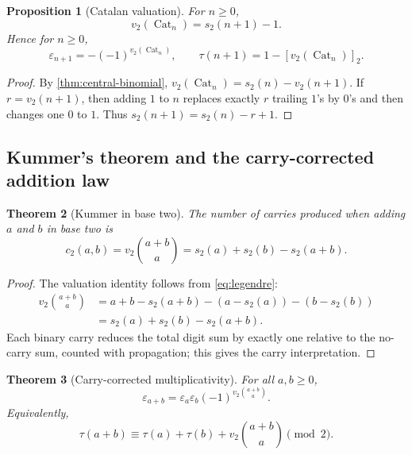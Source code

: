 \documentclass[11pt,oneside]{article}
\newtheorem{theorem}{Theorem}[section]
\newtheorem{proposition}[theorem]{Proposition}
\theoremstyle{definition}
\theoremstyle{remark}
\newcommand{\vtwo}{v_2}
\newcommand{\bitsum}{s_2}
\newcommand{\eps}{\varepsilon}
\newcommand{\res}[2]{\left[#1\right]_{#2}}
\newcommand{\Cat}{\operatorname{Cat}}
\begin{document}
\begin{proposition}[Catalan valuation]\label{prop:catalan}
For $n\ge0$,
\begin{equation}\label{eq:catalan-v2}
 \vtwo(\Cat_n)=\bitsum(n+1)-1.
\end{equation}
Hence for $n\ge0$,
\begin{equation}\label{eq:catalan-thue-morse}
 \eps_{n+1}=-(-1)^{\vtwo(\Cat_n)},
 \qquad
 \tau(n+1)=1-\res{\vtwo(\Cat_n)}{2}.
\end{equation}
\end{proposition}

\begin{proof}
By \cref{thm:central-binomial},
$\vtwo(\Cat_n)=\bitsum(n)-\vtwo(n+1)$.  If $r=\vtwo(n+1)$, then adding $1$ to
$n$ replaces exactly $r$ trailing $1$'s by $0$'s and then changes one $0$ to
$1$.  Thus $\bitsum(n+1)=\bitsum(n)-r+1$.
\end{proof}

\subsection{Kummer's theorem and the carry-corrected addition law}

\begin{theorem}[Kummer in base two]\label{thm:kummer}
The number of carries produced when adding $a$ and $b$ in base two is
\begin{equation}\label{eq:kummer}
 c_2(a,b)=\vtwo\binom{a+b}{a}
         =\bitsum(a)+\bitsum(b)-\bitsum(a+b).
\end{equation}
\end{theorem}

\begin{proof}
The valuation identity follows from \cref{eq:legendre}:
\begin{align*}
 \vtwo\binom{a+b}{a}
 &=a+b-\bitsum(a+b)-(a-\bitsum(a))-(b-\bitsum(b))\\
 &=\bitsum(a)+\bitsum(b)-\bitsum(a+b).
\end{align*}
Each binary carry reduces the total digit sum by exactly one relative to the
no-carry sum, counted with propagation; this gives the carry interpretation.
\end{proof}

\begin{theorem}[Carry-corrected multiplicativity]\label{thm:carry-law}
For all $a,b\ge0$,
\begin{equation}\label{eq:carry-law}
 \boxed{\ \eps_{a+b}=\eps_a\eps_b
     (-1)^{\vtwo\binom{a+b}{a}}.\ }
\end{equation}
Equivalently,
\begin{equation}\label{eq:tau-carry-law}
 \tau(a+b)\equiv \tau(a)+\tau(b)+\vtwo\binom{a+b}{a}\pmod2.
\end{equation}
\end{theorem}
\end{document}
